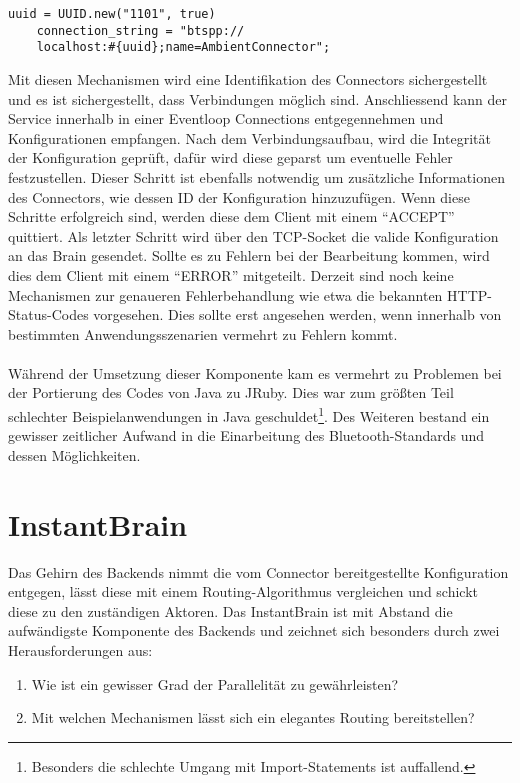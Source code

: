 \lstset{language=Ruby}
\begin{lstlisting}[caption=Erzeugung einer UUID und Bereitstellung des Bluetooth-Service, captionpos=b]
	uuid = UUID.new("1101", true)
	connection_string = "btspp://		  
	localhost:#{uuid};name=AmbientConnector";	
\end{lstlisting}
Mit diesen Mechanismen wird eine Identifikation des Connectors sichergestellt und es ist sichergestellt, dass Verbindungen möglich sind. Anschliessend kann der Service innerhalb in einer Eventloop Connections entgegennehmen und Konfigurationen empfangen. Nach dem Verbindungsaufbau, wird die Integrität der Konfiguration geprüft, dafür wird diese geparst um eventuelle Fehler festzustellen. Dieser Schritt ist ebenfalls notwendig um zusätzliche Informationen des Connectors, wie dessen ID der Konfiguration hinzuzufügen. Wenn diese Schritte erfolgreich sind, werden diese dem Client mit einem "`ACCEPT"' quittiert. 
Als letzter Schritt wird über den TCP-Socket die valide Konfiguration an das Brain gesendet. 
Sollte es zu Fehlern bei der Bearbeitung kommen, wird dies dem Client mit einem "`ERROR"'	 mitgeteilt. Derzeit sind noch keine Mechanismen zur genaueren Fehlerbehandlung wie etwa die bekannten HTTP-Status-Codes vorgesehen. Dies sollte erst angesehen werden, wenn innerhalb von bestimmten Anwendungsszenarien vermehrt zu Fehlern kommt. 
\\\\
Während der Umsetzung dieser Komponente kam es vermehrt zu Problemen bei der Portierung des Codes von Java zu JRuby. Dies war zum größten Teil schlechter Beispielanwendungen in Java geschuldet\footnote{Besonders die schlechte Umgang mit Import-Statements ist auffallend.}. Des Weiteren bestand ein gewisser zeitlicher Aufwand in die Einarbeitung des Bluetooth-Standards und dessen Möglichkeiten. 

\section{InstantBrain}
Das Gehirn des Backends nimmt die vom Connector bereitgestellte Konfiguration entgegen, lässt diese mit einem Routing-Algorithmus  vergleichen und schickt diese zu den zuständigen Aktoren. 
Das InstantBrain ist mit Abstand die aufwändigste Komponente des Backends und zeichnet sich besonders durch zwei Herausforderungen aus: 
\begin{enumerate}
     \item Wie ist ein gewisser Grad der Parallelität zu gewährleisten? 
     \item Mit welchen Mechanismen lässt sich ein elegantes Routing bereitstellen? 
\end{enumerate}

